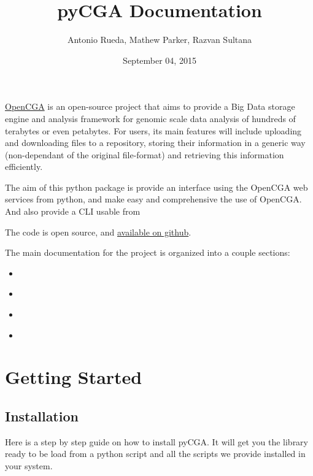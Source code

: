 \documentclass[letterpaper,10pt,english]{sphinxmanual}
\title{pyCGA Documentation}
\date{September 04, 2015}
\author{Antonio Rueda, Mathew Parker, Razvan Sultana}
\begin{document}
\maketitle
\tableofcontents
{}\label{documentation::doc}


\href{https://github.com/opencb/opencga/wiki}{OpenCGA}  is an open-source project that aims to provide a Big Data storage engine and analysis
framework for genomic scale data analysis of hundreds of terabytes or even petabytes. For users,
its main features will include uploading and downloading files to a repository, storing their
information in a generic way (non-dependant of the original file-format) and retrieving this information
efficiently.

The aim of this python package is provide an interface using the OpenCGA web services from python, and make
easy and comprehensive the use of OpenCGA. And also provide a CLI usable from

The code is open source, and \href{https://github.com/opencb/}{available on github}.

The main documentation for the project is organized into a couple sections:
\begin{itemize}
\item {} 
{\hyperref[documentation:getting-started]{\emph{}}}

\item {} 
{\hyperref[documentation:api-docs]{\emph{}}}

\item {} 
{\hyperref[documentation:cli-docs]{\emph{}}}

\item {} 
{\hyperref[documentation:dev-docs]{\emph{}}}

\end{itemize}


\chapter{Getting Started}
\label{documentation:welcome-to-pycga}\label{documentation:getting-started}\label{documentation:id1}

\section{Installation}
\label{installation:installation}\label{installation::doc}
Here is a step by step guide on how to install pyCGA. It will get you the library ready to be load from a python script and all the scripts we provide installed in your system.
\end{document}
